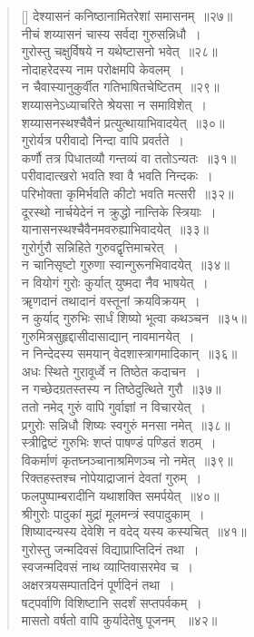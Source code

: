 \documentclass[twoside,12pt,notitlepage]{book}
\begin{document}
\begin{verse}[\versewidth]
देश्यासनं कनिष्ठानामितरेशां समासनम्~॥२७॥\\
नीचं शय्यासनं चास्य सर्वदा गुरुसन्निधौ~।\\[-6pt]
गुरोस्तु चक्षुर्विषये न यथेष्टासनो भवेत्~॥२८॥\\
नोदाहरेदस्य नाम परोक्षमपि केवलम्~।\\[-6pt]
न चैवास्यानुकुर्वीत गतिभाषितचेष्टितम्~॥२९॥\\
शय्यासनेऽध्याचरिते श्रेयसा न समाविशेत्~।\\[-6pt]
शय्यासनस्थश्चैवैनं प्रत्युत्थायाभिवादयेत्~॥३०॥\footA \\
गुरोर्यत्र परीवादो निन्दा वापि प्रवर्तते~।\\[-6pt]
कर्णौ तत्र पिधातव्यौ गन्तव्यं वा ततोऽन्यतः~॥३१॥\\
परीवादात्खरो भवति श्वा वै भवति निन्दकः~।\\[-6pt]
परिभोक्ता कृमिर्भवति कीटो भवति मत्सरी~॥३२॥\\
दूरस्थो नार्चयेदेनं न क्रुद्धो नान्तिके स्त्रियाः~।\\[-6pt]
यानासनस्थश्चैवैनमवरुह्याभिवादयेत्~॥३३॥\\
गुरोर्गुरौ सन्निहिते गुरुवद्वृत्तिमाचरेत्~।\\[-6pt]
न चानिसृष्टो गुरुणा स्वान्गुरूनभिवादयेत्~॥३४॥\footA \\
न वियोगं गुरोः कुर्यात् युष्मदा नैव भाषयेत्~।\\[-6pt]
ॠणदानं तथादानं वस्तूनां क्रयविक्रयम्~।\\[-6pt]
न कुर्याद् गुरुभिः सार्धं शिष्यो भूत्वा कथञ्चन~॥३५॥\\
गुरुमित्रसुहृद्दासीदासाद्यान् नावमानयेत्~।\\[-6pt]
न निन्देदस्य समयान्  वेदशास्त्रागमादिकान्~॥३६॥\footA \\
अधः स्थिते गुरावूर्ध्वे न तिष्ठेत कदाचन~।\\[-6pt]
न गच्छेदग्रतस्तस्य न तिष्ठेदुत्थिते गुरौ~॥३७॥\\
ततो नमेद् गुरुं वापि गुर्वाज्ञां न विचारयेत्~।\\[-6pt]
प्रगुरोः सन्निधौ शिष्यः स्वगुरुं मनसा नमेत्~॥३८॥\\
स्त्रीद्विष्टं  गुरुभिः शप्तं पाषण्डं पण्डितं शठम्~।\\[-6pt]
 विकर्माणं  कृतघ्नञ्चानाश्रमिणञ्च नो नमेत्~॥३९॥\\
रिक्तहस्तश्च नोपेयाद्राजानं देवतां गुरुम्~।\\[-6pt]
फलपुष्पाम्बरादीनि यथाशक्ति समर्पयेत्~॥४०॥\\
श्रीगुरोः पादुकां मुद्रां मूलमन्त्रं स्वपादुकाम्~।\\[-6pt]
शिष्यादन्यस्य देवेशि न वदेद् यस्य कस्यचित्~॥४१॥\\
 गुरोस्तु जन्मदिवसं विद्याप्राप्तिदिनं तथा~।\\[-6pt]
 स्वजन्मदिवसं नाथ व्याप्तिवासरमेव च~।\\[-6pt]
 अक्षरत्रयसम्पातदिनं पूर्णदिनं तथा~।\\[-6pt]
 षट्‌पर्वाणि विशिष्टानि सदर्शं सप्तपर्वकम्~।\\[-6pt]
 मासतो वर्षतो वापि कुर्यादेतेषु पूजनम् \footB\ ॥४२॥\\ 
\end{verse}
\end{document}
